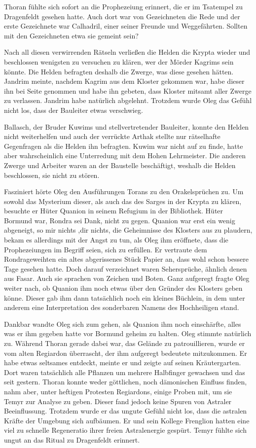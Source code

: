 Thoran fühlte sich sofort an die Prophezeiung erinnert, die er im Tsatempel zu Dragenfeldt gesehen hatte. Auch dort war von Gezeichneten die Rede und der erste Gezeichnete war Calhadril, einer seiner Freunde und Weggefährten. Sollten mit den Gezeichneten etwa sie gemeint sein?

Nach all diesen verwirrenden Rätseln verließen die Helden die Krypta wieder und beschlossen wenigsten zu versuchen zu klären, wer der Mörder Kagrims sein könnte. Die Helden befragten deshalb die Zwerge, was diese gesehen hätten. Jandrim meinte, nachdem Kagrim aus dem Kloster gekommen war, habe dieser ihn bei Seite genommen und habe ihn gebeten, dass Kloster mitsamt aller Zwerge zu verlassen. Jandrim habe natürlich abgelehnt. Trotzdem wurde Oleg das Gefühl nicht los, dass der Bauleiter etwas verschwieg.

Ballasch, der Bruder Kuwims und stellvertretender Bauleiter, konnte den Helden nicht weiterhelfen und auch der verrückte Arthak stellte nur rätselhafte Gegenfragen als die Helden ihn befragten. Kuwim war nicht auf zu finde, hatte aber wahrscheinlich eine Unterredung mit dem Hohen Lehrmeister. Die anderen Zwerge und Arbeiter waren an der Baustelle beschäftigt, weshalb die Helden beschlossen, sie nicht zu stören.

Fasziniert hörte Oleg den Ausführungen Torans zu den Orakelsprüchen zu. Um sowohl das Mysterium dieser, als auch das des Sarges in der Krypta zu klären, besuchte er Hüter Quanion in seinem Refugium in der Bibliothek. Hüter Bormund war, Rondra sei Dank, nicht zu gegen. Quanion war erst ein wenig abgeneigt, so mir nichts ,dir nichts, die Geheimnisse des Klosters aus zu plaudern, bekam es allerdings mit der Angst zu tun, als Oleg ihm eröffnete, dass die Prophezeiungen im Begriff seien, sich zu erfüllen. Er vertraute dem Rondrageweihten ein altes abgerissenes Stück Papier an, dass wohl schon bessere Tage gesehen hatte. Doch darauf verzeichnet waren Sehersprüche, ähnlich denen aus Fasar. Auch sie sprachen von Zeichen und Boten. Ganz aufgeregt fragte Oleg weiter nach, ob Quanion ihm noch etwas über den Gründer des Klosters geben könne. Dieser gab ihm dann tatsächlich noch ein kleines Büchlein, in dem unter anderem eine Interpretation des sonderbaren Namens des Hochheiligen stand. 


Dankbar wandte Oleg sich zum gehen, als Quanion ihm noch einschärfte, alles was er ihm gegeben hatte vor Bormund geheim zu halten. Oleg stimmte natürlich zu. Während Thoran gerade dabei war, das Gelände zu patrouillieren, wurde er vom alten Regiardon überrascht, der ihm aufgeregt bedeutete mitzukommen. Er habe etwas seltsames entdeckt, meinte er und zeigte auf seinen Kräutergarten. Dort waren tatsächlich alle Pflanzen um mehrere Halbfinger gewachsen und das seit gestern. Thoran konnte weder göttlichen, noch dämonischen Einfluss finden, nahm aber, unter heftigen Protesten Regiardons, einige Proben mit, um sie Temyr zur Analyse zu geben. Dieser fand jedoch keine Spuren von Astraler Beeinflussung. Trotzdem wurde er das ungute Gefühl nicht los, dass die astralen Kräfte der Umgebung sich aufbäumen. Er und sein Kollege Frenglion hatten eine viel zu schnelle Regeneratio ihrer freien Astralenergie gespürt. Temyr fühlte sich ungut an das Ritual zu Dragenfeldt erinnert.


